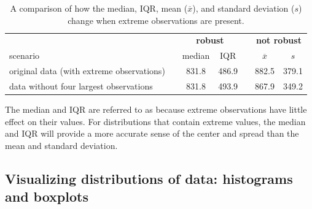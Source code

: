 \begin{table}[ht]
	\centering
	\begin{tabular}{l c cc c cc}
		\hline
		& \hspace{0mm} & \multicolumn{2}{c}{\bf robust} & \hspace{2mm} & \multicolumn{2}{c}{\bf not robust} \\
		scenario && median & IQR && $\overline{x}$ & $s$ \\ 
		\hline
		original data (with extreme observations) 	&& 831.8 & 486.9 && 882.5 & 379.1 \\
		data without four largest observations && 831.8 & 493.9 && 867.9 & 349.2 \\
		\hline
	\end{tabular}
	\caption{A comparison of how the median, IQR, mean ($\overline{x}$), and standard deviation ($s$) change when extreme observations are present.}
	\label{frogRobustOrNotTable}
\end{table}

The median and IQR are referred to as  because extreme observations have little effect on their values. For distributions that contain extreme values, the median and IQR will provide a more accurate sense of the center and spread than the mean and standard deviation. 

\newpage

\subsection{Visualizing distributions of data: histograms and boxplots}
\label{histogramsBoxplots}

